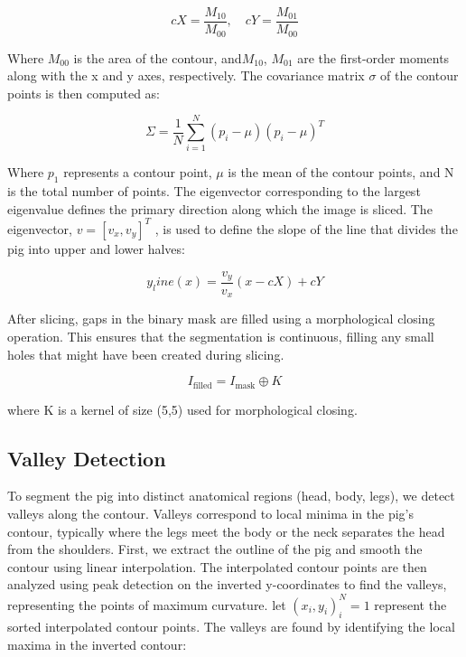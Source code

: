 {\myequation{}
\begin{equation}
	cX = \frac{M_{10}}{M_{00}}, \quad cY = \frac{M_{01}}{M_{00}}
\end{equation}

Where $M_00$ is the area of the contour, and$M_10$, $M_01$ are the first-order moments along with the x and y axes, respectively.
The covariance matrix $\sigma$ of the contour points is then computed as:

\myequation{}
\begin{equation}
	\Sigma = \frac{1}{N} \sum_{i=1}^{N} (p_i - \mu)(p_i - \mu)^T
\end{equation}

Where $p_1$ represents a contour point, $\mu$ is the mean of the contour points, and N is the total number of points. The eigenvector corresponding to the largest eigenvalue defines the primary direction along which the image is sliced. The eigenvector, $v=[v_x, v_y]^T$ , is used to define the slope of the line that divides the pig into upper and lower halves:

\myequation{}
\begin{equation}
	y_line(x)=\frac{v_y}{v_x} (x-cX) + cY
\end{equation}

After slicing, gaps in the binary mask are filled using a morphological closing operation. This ensures that the segmentation is continuous, filling any small holes that might have been created during slicing.

\myequation{}
\begin{equation}
	I_{\text{filled}} = I_{\text{mask}} \oplus K
\end{equation}

where K is a kernel of size (5,5) used for morphological closing.

\subsection{Valley Detection}
To segment the pig into distinct anatomical regions (head, body, legs), we detect valleys along the contour. Valleys correspond to local minima in the pig’s contour, typically where the legs meet the body or the neck separates the head from the shoulders.
First, we extract the outline of the pig and smooth the contour using linear interpolation. The interpolated contour points are then analyzed using peak detection on the inverted y-coordinates to find the valleys, representing the points of maximum curvature.
let ${(x_i, y_i)}^N _i=1$ represent the sorted interpolated contour points. The valleys are found by identifying the local maxima in the inverted contour:

}
